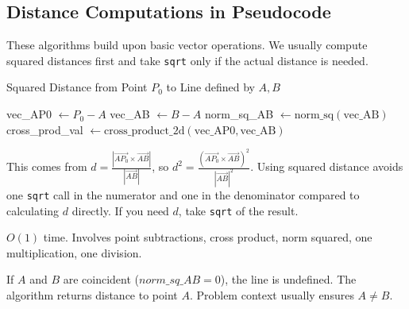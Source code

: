 \subsection{Distance Computations in Pseudocode}
\label{ssec:A.2.2}

These algorithms build upon basic vector operations. We usually compute squared distances first and take \texttt{sqrt} only if the actual distance is needed.

\begin{algorithm}[H]
\caption{Squared Distance from Point $P_0$ to Line defined by $A, B$}
\label{alg:A.2.2.dist_sq_point_line}
vec\_AP0 $\leftarrow P_0 - A$\;
vec\_AB $\leftarrow B - A$\;
norm\_sq\_AB $\leftarrow \text{norm\_sq}(\text{vec\_AB})$\;
 {  } 
cross\_prod\_val $\leftarrow \text{cross\_product\_2d}(\text{vec\_AP0}, \text{vec\_AB})$\;
\end{algorithm}
\begin{intuition}
\label{intuition:A.2.2.dist_sq_point_line}
This comes from $d = \frac{|\vec{AP_0} \times \vec{AB}|}{|\vec{AB}|}$, so $d^2 = \frac{(\vec{AP_0} \times \vec{AB})^2}{|\vec{AB}|^2}$.
Using squared distance avoids one \texttt{sqrt} call in the numerator and one in the denominator compared to calculating $d$ directly. If you need $d$, take \texttt{sqrt} of the result.
\end{intuition}
\begin{complexity}
\label{comp:A.2.2.dist_sq_point_line}
$O(1)$ time. Involves point subtractions, cross product, norm squared, one multiplication, one division.
\end{complexity}
\begin{gotcha}
\label{gotcha:A.2.2.dist_point_line_AB_coincident}
If $A$ and $B$ are coincident ($norm\_sq\_AB = 0$), the line is undefined. The algorithm returns distance to point $A$. Problem context usually ensures $A \neq B$.
\end{gotcha}

